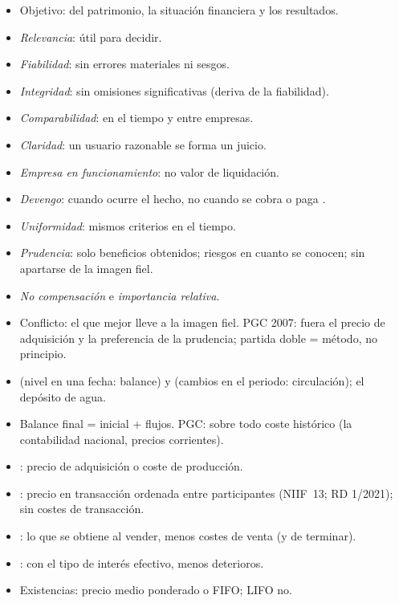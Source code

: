 \documentclass{article}
\begin{document}
\begin{columnas}
\begin{itemize}
\item Objetivo:  del patrimonio, la situación financiera y los resultados.
\end{itemize}
\begin{itemize}
\item \emph{Relevancia}: útil para decidir.
\item \emph{Fiabilidad}: sin errores materiales ni sesgos.
\item \emph{Integridad}: sin omisiones significativas (deriva de la fiabilidad).
\item \emph{Comparabilidad}: en el tiempo y entre empresas.
\item \emph{Claridad}: un usuario razonable se forma un juicio.
\end{itemize}
\begin{itemize}
\item \emph{Empresa en funcionamiento}: no valor de liquidación.
\item \emph{Devengo}: cuando ocurre el hecho, no cuando se cobra o paga .
\item \emph{Uniformidad}: mismos criterios en el tiempo.
\item \emph{Prudencia}: solo beneficios obtenidos; riesgos en cuanto se conocen; sin apartarse de la imagen fiel.
\item \emph{No compensación} e \emph{importancia relativa}.
\item Conflicto: el que mejor lleve a la imagen fiel. PGC 2007: fuera el precio de adquisición y la preferencia de la prudencia; partida doble = método, no principio.
\end{itemize}

\begin{itemize}
\item {} (nivel en una fecha: balance) y  (cambios en el periodo: circulación); el depósito de agua.
\item Balance final = inicial + flujos. PGC: sobre todo coste histórico (la contabilidad nacional, precios corrientes).
\end{itemize}
\begin{itemize}
\item {}: precio de adquisición o coste de producción.
\item {}: precio en transacción ordenada entre participantes (NIIF~13; RD 1/2021); sin costes de transacción.
\item {}: lo que se obtiene al vender, menos costes de venta (y de terminar).
\item {}: con el tipo de interés efectivo, menos deterioros.
\item Existencias: precio medio ponderado o FIFO; LIFO no.
\end{itemize}


\end{columnas}
\end{document}
